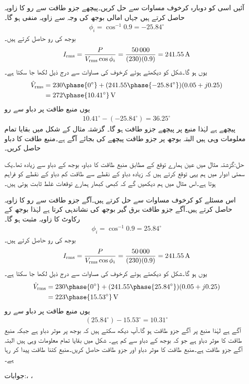 آئیں اسی کو دوبارہ کرخوف مساوات سے حل کریں۔پیچھے جزو طاقت  سے رو کا زاویہ حاصل کرتے ہیں جہاں امالی بوجھ کی وجہ سے زاویہ منفی ہو گا۔
\begin{align*}
\phi_i=\cos^{-1} 0.9=-25.84^{\circ}
\end{align*}
بوجھ کی رو حاصل کرتے ہیں۔
\begin{align*}
{\ensuremath{I_{\textup{rms}}}}=\frac{P}{{V_{\textup{rms}}} \cos \phi_i}=\frac{\num{50000}}{(230)(0.9)}=\SI{241.55}{\ampere}
\end{align*}
یوں  ہو گا۔شکل کو دیکھتے ہوئے کرخوف کی مساوات سے درج ذیل لکھا جا سکتا ہے۔
\begin{align*}
\hat{V}_{\textup{rms}}&=230\phase{0^{\circ}}+(241.55\phase{-25.84^{\circ}})(0.05+j0.25)\\
&=272\phase{10.41^{\circ}}\,\si{\volt}
\end{align*}
یوں منبع طاقت پر دباو سے رو
\begin{align*}
10.41^{\circ}-(-25.84^{\circ})=36.25^{\circ}
\end{align*}
پیچھے ہے لہٰذا منبع پر پیچھے جزو طاقت  ہو گا۔
گزشتہ مثال کے شکل  میں بقایا تمام معلومات وہی ہیں البتہ بوجھ پر جزو طاقت پیچھے کی بجائے آگے ہے۔منبع طاقت کا دباو حاصل کریں۔

حل:گزشتہ مثال میں عین ہمارے توقع کے مطابق منبع طاقت کا دباو، بوجھ کے دباو سے زیادہ تھا۔یک سمتی ادوار میں ہم یہی توقع کرتے ہیں کہ زیادہ دباو کے نقطے سے طاقت  کم دباو کے نقطے  کو فراہم ہوتا ہے۔اس مثال میں ہم دیکھیں گے کہ کبھی کبھار ہمارے توقعات غلط ثابت ہوتی ہیں۔ 
 
اس مسئلے کو کرخوف مساوات سے حل کرتے ہیں۔آگے جزو طاقت  سے رو کا زاویہ حاصل کرتے ہیں۔آگے جزو طاقت برق گیر بوجھ کی نشاندہی کرتا ہے لہٰذا بوجھ کے رکاوٹ کا زاویہ مثبت ہو گا۔
\begin{align*}
\phi_i=\cos^{-1} 0.9=25.84^{\circ}
\end{align*}
بوجھ کی رو حاصل کرتے ہیں۔
\begin{align*}
{\ensuremath{I_{\textup{rms}}}}=\frac{P}{{V_{\textup{rms}}} \cos \phi_i}=\frac{\num{50000}}{(230)(0.9)}=\SI{241.55}{\ampere}
\end{align*}
یوں  ہو گا۔شکل کو دیکھتے ہوئے کرخوف کی مساوات سے درج ذیل لکھا جا سکتا ہے۔
\begin{align*}
\hat{V}_{\textup{rms}}&=230\phase{0^{\circ}}+(241.55\phase{25.84^{\circ}})(0.05+j0.25)\\
&=223\phase{15.53^{\circ}}\,\si{\volt}
\end{align*}
یوں منبع طاقت پر دباو سے رو
\begin{align*}
(25.84^{\circ})-15.53^{\circ}=10.31^{\circ}
\end{align*}
آگے  ہے لہٰذا منبع پر آگے جزو طاقت  ہو گا۔آپ دیکھ سکتے ہیں کہ بوجھ پر موثر دباو  ہے جبکہ منبع طاقت کا موثر دباو  ہے جو کہ بوجھ کے دباو سے کم ہے۔
شکل  میں بقایا تمام معلومات وہی ہیں البتہ آگے جزو طاقت  ہے۔منبع طاقت کا موثر دباو اور جزو طاقت حاصل کریں۔منبع کتنا طاقت پیدا کر رہا ہے۔

جوابات:، ، 
